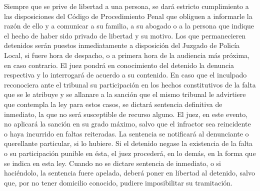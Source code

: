     Siempre que se prive de libertad a una persona, se dará estricto cumplimiento a las disposiciones del Código de Procedimiento Penal que obliguen a informarle la razón de ello y a comunicar a su familia, a su abogado o a la persona que indique el hecho de haber sido privado de libertad y su motivo.
    Los que permanecieren detenidos serán puestos inmediatamente a disposición del Juzgado de Policía Local, si fuere hora de despacho, o a primera hora de la audiencia más próxima, en caso contrario.
    El juez pondrá en conocimiento del detenido la denuncia respectiva y lo interrogará de acuerdo a su contenido. En caso que el inculpado reconociera ante el tribunal su participación en los hechos constitutivos de la falta que se le atribuye y se allanare a la sanción que el mismo tribunal le advirtiere que contempla la ley para estos casos, se dictará sentencia definitiva de inmediato, la que no será susceptible de recurso alguno. El juez, en este evento, no aplicará la sanción en su grado máximo, salvo que el infractor sea reincidente o haya incurrido en faltas reiteradas.
    La sentencia se notificará al denunciante o querellante particular, si lo hubiere.
    Si el detenido negase la existencia de la falta o su participación punible en ésta, el juez procederá, en lo demás, en la forma que se indica en esta ley. Cuando no se dictare sentencia de inmediato, o si haciéndolo, la sentencia fuere apelada, deberá poner en libertad al detenido, salvo que, por no tener domicilio conocido, pudiere imposibilitar su tramitación.

